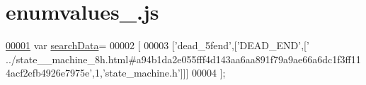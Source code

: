 \hypertarget{enumvalues__2_8js_source}{}\section{enumvalues\+\_.\+js}
\label{enumvalues__2_8js_source}

\begin{DoxyCode}
\hypertarget{enumvalues__2_8js_source.tex_l00001}{}\hyperlink{enumvalues__2_8js_ad01a7523f103d6242ef9b0451861231e}{00001} var \hyperlink{enumvalues__2_8js_ad01a7523f103d6242ef9b0451861231e}{searchData}=
00002 [
00003   [\textcolor{stringliteral}{'dead\_5fend'},[\textcolor{stringliteral}{'DEAD\_END'},[\textcolor{stringliteral}{'
      ../state\_\_machine\_8h.html#a94b1da2e055fff4d143aa6aa891f79a9ae66a6dc1f3ff114acf2efb4926e7975e'},1,\textcolor{stringliteral}{'state\_machine.h'}]]]
00004 ];
\end{DoxyCode}
